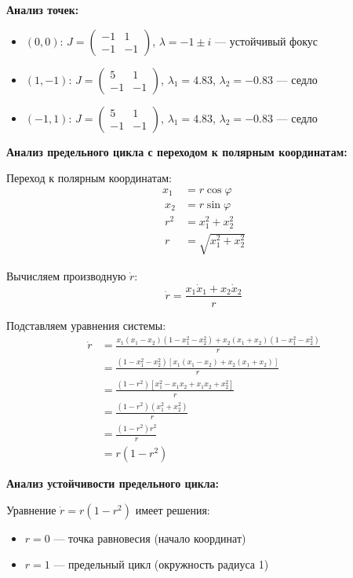\textbf{Анализ точек:}
\begin{itemize}
\item $(0, 0)$: $J = \begin{pmatrix} -1 & 1 \\ -1 & -1 \end{pmatrix}$, $\lambda = -1 \pm i$ --- устойчивый фокус
\item $(1, -1)$: $J = \begin{pmatrix} 5 & 1 \\ -1 & -1 \end{pmatrix}$, $\lambda_1 = 4.83$, $\lambda_2 = -0.83$ --- седло
\item $(-1, 1)$: $J = \begin{pmatrix} 5 & 1 \\ -1 & -1 \end{pmatrix}$, $\lambda_1 = 4.83$, $\lambda_2 = -0.83$ --- седло
\end{itemize}

\textbf{Анализ предельного цикла с переходом к полярным координатам:}

Переход к полярным координатам:
\begin{align}
x_1 &= r\cos\varphi \\\
x_2 &= r\sin\varphi \\\
r^2 &= x_1^2 + x_2^2 \\\
r &= \sqrt{x_1^2 + x_2^2}
\end{align}

Вычисляем производную $\dot{r}$:
$$\dot{r} = \frac{x_1\dot{x}_1 + x_2\dot{x}_2}{r}$$

Подставляем уравнения системы:
\begin{align}
\dot{r} &= \frac{x_1(x_1 - x_2)(1 - x_1^2 - x_2^2) + x_2(x_1 + x_2)(1 - x_1^2 - x_2^2)}{r} \\\
&= \frac{(1 - x_1^2 - x_2^2)[x_1(x_1 - x_2) + x_2(x_1 + x_2)]}{r} \\\
&= \frac{(1 - r^2)[x_1^2 - x_1x_2 + x_1x_2 + x_2^2]}{r} \\\
&= \frac{(1 - r^2)(x_1^2 + x_2^2)}{r} \\\
&= \frac{(1 - r^2)r^2}{r} \\\
&= r(1 - r^2)
\end{align}

\textbf{Анализ устойчивости предельного цикла:}

Уравнение $\dot{r} = r(1 - r^2)$ имеет решения:
\begin{itemize}
\item $r = 0$ --- точка равновесия (начало координат)
\item $r = 1$ --- предельный цикл (окружность радиуса 1)
\end{itemize}

